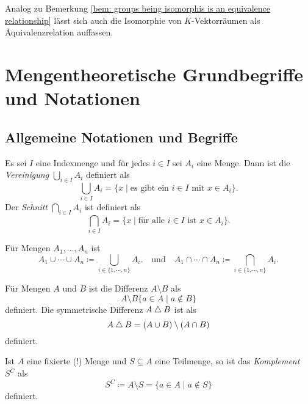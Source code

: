 \begin{bem}
 Analog zu Bemerkung \ref{bem: groups being isomorphis is an equivalence relationship} lässt sich auch die Isomorphie von $K$-Vek\-tor\-räu\-men als Äquivalenzrelation auffassen.
\end{bem}







\section{Mengentheoretische Grundbegriffe und Notationen}



\subsection{Allgemeine Notationen und Begriffe}


\begin{defi}
 Es sei $I$ eine Indexmenge und für jedes $i \in I$ sei $A_i$ eine Menge. Dann ist die \emph{Vereinigung} $\bigcup_{i \in I} A_i$ definiert als
 \[
  \bigcup_{i \in I} A_i
  = \{x \mid \text{es gibt ein $i \in I$ mit $x \in A_i$}\}.
 \]
 Der \emph{Schnitt} $\bigcap_{i \in I} A_i$ ist definiert als
 \[
  \bigcap_{i \in I} A_i
  = \{x \mid \text{für alle $i \in I$ ist $x \in A_i$}\}.
 \]
 
 Für Mengen $A_1, \dotsc, A_n$ ist
 \[
  A_1 \cup \dotsb \cup A_n \coloneqq \bigcup_{i \in \{1, \dotsb, n\}} A_i.
  \quad\text{und}\quad
  A_1 \cap \dotsb \cap A_n \coloneqq \bigcap_{i \in \{1, \dotsb, n\}} A_i.
 \]
\end{defi}


\begin{defi}
 Für Mengen $A$ und $B$ ist die Differenz $A \setminus B$ als
 \[
  A \setminus B \{a \in A \mid a \notin B\}
 \]
 definiert. Die symmetrische Differenz $A \bigtriangleup B$ ist als
 \[
  A \bigtriangleup B = (A \cup B) \setminus (A \cap B)
 \]
 definiert.
\end{defi}


\begin{defi}
 Ist $A$ eine fixierte (!) Menge und $S \subseteq A$ eine Teilmenge, so ist das \emph{Komplement} $S^C$ als
 \[
  S^C
  \coloneqq A \setminus S
  = \{a \in A \mid a \notin S\}
 \]
 definiert.
\end{defi}



